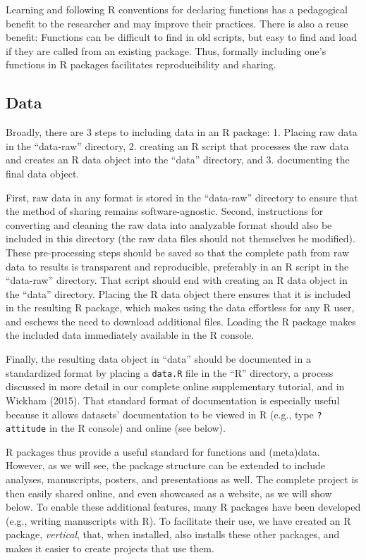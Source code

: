 \documentclass[
  english,
  jou,floatsintext]{apa6}
\begin{document}
Learning and following R conventions for declaring functions has a pedagogical benefit to the researcher and may improve their practices. There is also a reuse benefit: Functions can be difficult to find in old scripts, but easy to find and load if they are called from an existing package. Thus, formally including one's functions in R packages facilitates reproducibility and sharing.

\hypertarget{data}{%
\subsection{Data}\label{data}}

Broadly, there are 3 steps to including data in an R package: 1. Placing raw data in the ``data-raw'' directory, 2. creating an R script that processes the raw data and creates an R data object into the ``data'' directory, and 3. documenting the final data object.

First, raw data in any format is stored in the ``data-raw'' directory to ensure that the method of sharing remains software-agnostic. Second, instructions for converting and cleaning the raw data into analyzable format should also be included in this directory (the raw data files should not themselves be modified). These pre-processing steps should be saved so that the complete path from raw data to results is transparent and reproducible, preferably in an R script in the ``data-raw'' directory. That script should end with creating an R data object in the ``data'' directory. Placing the R data object there ensures that it is included in the resulting R package, which makes using the data effortless for any R user, and eschews the need to download additional files. Loading the R package makes the included data immediately available in the R console.

Finally, the resulting data object in ``data'' should be documented in a standardized format by placing a \texttt{data.R} file in the ``R'' directory, a process discussed in more detail in our complete online supplementary tutorial, and in Wickham (2015). That standard format of documentation is especially useful because it allows datasets' documentation to be viewed in R (e.g., type \texttt{?attitude} in the R console) and online (see below).

R packages thus provide a useful standard for functions and (meta)data. However, as we will see, the package structure can be extended to include analyses, manuscripts, posters, and presentations as well. The complete project is then easily shared online, and even showcased as a website, as we will show below. To enable these additional features, many R packages have been developed (e.g., writing manuscripts with R). To facilitate their use, we have created an R package, \emph{vertical}, that, when installed, also installs these other packages, and makes it easier to create projects that use them.
\end{document}
